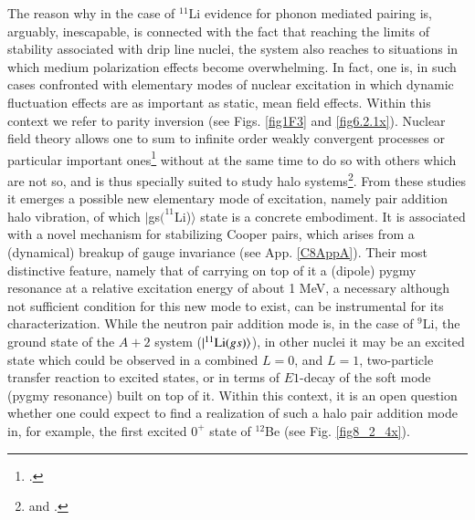  The reason why in the case of $^{11}$Li evidence for phonon mediated pairing is, arguably, inescapable, is connected with the fact that reaching the limits of stability associated with drip line nuclei, the system also reaches to situations in which medium polarization effects become overwhelming. In fact, one is, in such cases confronted with elementary modes of nuclear excitation in which dynamic fluctuation effects are as important as static, mean field effects. Within this context we refer to  parity inversion (see Figs. \ref{fig1F3}  and \ref{fig6.2.1x}). Nuclear field theory  allows one to sum to infinite order weakly convergent processes or particular important ones\footnote{\cite{Bortignon:78}.} without at the same time to do so with others which are not so, and is thus specially suited to study halo systems\footnote{\citet{Barranco:01} and \citet{Gori:04}.}. From these studies it emerges a possible new elementary mode of excitation, namely pair addition halo vibration, of which $|$gs$(^{11}$Li)$\rangle$ state is a concrete embodiment. It is associated with a novel mechanism  for stabilizing Cooper pairs, which arises from a (dynamical) breakup of gauge invariance (see App. \ref{C8AppA}). Their most distinctive feature, namely that of carrying on top of it a (dipole) pygmy resonance at a relative excitation energy of about 1 MeV, a necessary although not sufficient condition for this new mode to exist, can be instrumental for its characterization. While the neutron pair addition mode is, in the case of $^9$Li, the ground state of the $A+2$ system ($|{^{11}\text{Li}(gs)} \rangle$), in other nuclei  it may be an excited state which could  be  observed in a combined $L=0$, and $L=1$, two-particle transfer reaction to excited states, or in terms of $E1$-decay of the soft mode (pygmy resonance) built on top of it. Within this context, it is an open question whether one could expect to find  a realization of such a halo pair addition mode in, for example, the first excited $0^+$ state of $^{12}$Be (see Fig. \ref{fig8_2_4x}).
